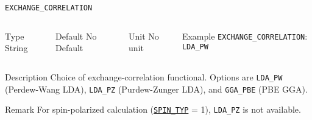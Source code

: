\documentclass[xcolor=dvipsnames,t]{beamer}
\begin{document}
\begin{frame}[allowframebreaks]{\texttt{EXCHANGE\_CORRELATION}} \label{EXCHANGE_CORRELATION}
\vspace*{-12pt}
\begin{columns}
\begin{block}{Type}
String
\end{block}

\begin{block}{Default}
No Default
\end{block}

\begin{block}{Unit}
No unit
\end{block}

\begin{block}{Example}
\texttt{EXCHANGE\_CORRELATION}: \texttt{LDA\_PW}
\end{block}
\end{columns}

\begin{block}{Description}
Choice of exchange-correlation functional. Options are \texttt{LDA\_PW} (Perdew-Wang LDA), \texttt{LDA\_PZ} (Purdew-Zunger LDA), and \texttt{GGA\_PBE} (PBE GGA).
\end{block}

\begin{block}{Remark}
For spin-polarized calculation (\hyperlink{SPIN_TYP}{\texttt{SPIN\_TYP}} = 1), \texttt{LDA\_PZ} is not available.
\end{block}

\end{frame}
\end{document}
